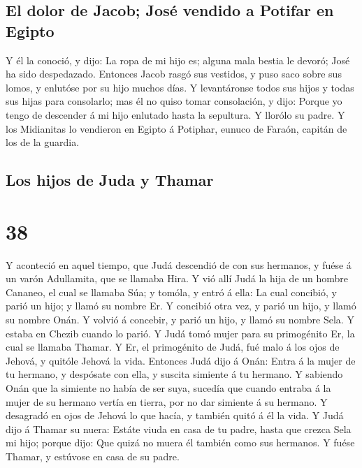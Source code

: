 \hypertarget{el-dolor-de-jacob-josuxe9-vendido-a-potifar-en-egipto}{%
\subsection{El dolor de Jacob; José vendido a Potifar en
Egipto}\label{el-dolor-de-jacob-josuxe9-vendido-a-potifar-en-egipto}}

 Y él la conoció, y dijo: La ropa de mi hijo es; alguna
mala bestia le devoró; José ha sido despedazado.  Entonces
Jacob rasgó sus vestidos, y puso saco sobre sus lomos, y enlutóse por su
hijo muchos días.  Y levantáronse todos sus hijos y todas
sus hijas para consolarlo; mas él no quiso tomar consolación, y dijo:
Porque yo tengo de descender á mi hijo enlutado hasta la sepultura. Y
llorólo su padre.  Y los Midianitas lo vendieron en Egipto
á Potiphar, eunuco de Faraón, capitán de los de la guardia.

\hypertarget{los-hijos-de-juda-y-thamar}{%
\subsection{Los hijos de Juda y
Thamar}\label{los-hijos-de-juda-y-thamar}}

\hypertarget{section-37}{%
\section{38}\label{section-37}}

 Y aconteció en aquel tiempo, que Judá descendió de con sus
hermanos, y fuése á un varón Adullamita, que se llamaba Hira.
 Y vió allí Judá la hija de un hombre Cananeo, el cual se
llamaba Súa; y tomóla, y entró á ella:  La cual concibió, y
parió un hijo; y llamó su nombre Er.  Y concibió otra vez, y
parió un hijo, y llamó su nombre Onán.  Y volvió á concebir,
y parió un hijo, y llamó su nombre Sela. Y estaba en Chezib cuando lo
parió.  Y Judá tomó mujer para su primogénito Er, la cual se
llamaba Thamar.  Y Er, el primogénito de Judá, fué malo á
los ojos de Jehová, y quitóle Jehová la vida.  Entonces Judá
dijo á Onán: Entra á la mujer de tu hermano, y despósate con ella, y
suscita simiente á tu hermano.  Y sabiendo Onán que la
simiente no había de ser suya, sucedía que cuando entraba á la mujer de
su hermano vertía en tierra, por no dar simiente á su hermano.
 Y desagradó en ojos de Jehová lo que hacía, y también
quitó á él la vida.  Y Judá dijo á Thamar su nuera: Estáte
viuda en casa de tu padre, hasta que crezca Sela mi hijo; porque dijo:
Que quizá no muera él también como sus hermanos. Y fuése Thamar, y
estúvose en casa de su padre.

